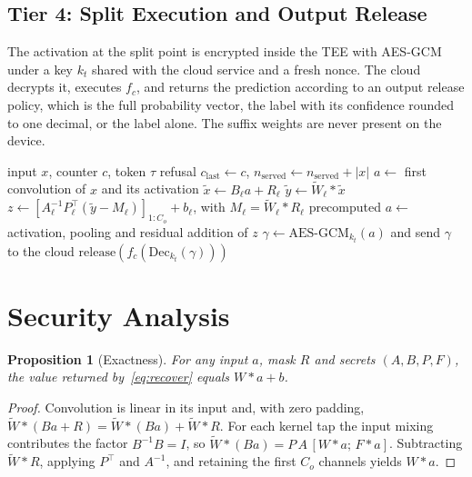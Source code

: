 \documentclass[lettersize,journal]{IEEEtran}
\newtheorem{proposition}{Proposition}
\begin{document}
\subsection{Tier 4: Split Execution and Output Release}
The activation at the split point is encrypted inside the TEE with AES-GCM~\cite{dworkin2007gcm} under a key $k_t$ shared with the cloud service and a fresh nonce. The cloud decrypts it, executes $f_c$, and returns the prediction according to an output release policy, which is the full probability vector, the label with its confidence rounded to one decimal, or the label alone. The suffix weights are never present on the device.

\begin{algorithm}[!t]
\caption{GHOST inference for one request}
\label{alg:ghost}
\begin{algorithmic}[1]
\Require input $x$, counter $c$, token $\tau$
  \State \Return refusal 
\EndIf
\State $c_{\mathrm{last}}\gets c$, $n_{\mathrm{served}}\gets n_{\mathrm{served}}+|x|$
\State $a\gets$ first convolution of $x$ and its activation 
  \State $\tilde x\gets B_\ell a+R_\ell$ 
  \State $\tilde y\gets \tilde W_\ell*\tilde x$ 
  \State $z\gets [A_\ell^{-1}P_\ell^{\top}(\tilde y-M_\ell)]_{1:C_o}+b_\ell$, with $M_\ell=\tilde W_\ell*R_\ell$ precomputed 
  \State $a\gets$ activation, pooling and residual addition of $z$ 
\EndFor
\State $\gamma\gets \mathrm{AES\text{-}GCM}_{k_t}(a)$ and send $\gamma$ to the cloud 
\State \Return $\mathrm{release}(f_c(\mathrm{Dec}_{k_t}(\gamma)))$ 
\end{algorithmic}
\end{algorithm}

\section{Security Analysis}
\label{sec:analysis}

\begin{proposition}[Exactness]
\label{prop:exact}
For any input $a$, mask $R$ and secrets $(A,B,P,F)$, the value returned by~\eqref{eq:recover} equals $W*a+b$.
\end{proposition}
\begin{proof}
Convolution is linear in its input and, with zero padding, $\tilde W*(Ba+R)=\tilde W*(Ba)+\tilde W*R$. For each kernel tap the input mixing contributes the factor $B^{-1}B=I$, so $\tilde W*(Ba)=P\,A\,[W*a;\,F*a]$. Subtracting $\tilde W*R$, applying $P^{\top}$ and $A^{-1}$, and retaining the first $C_o$ channels yields $W*a$.
\end{proof}
\end{document}
